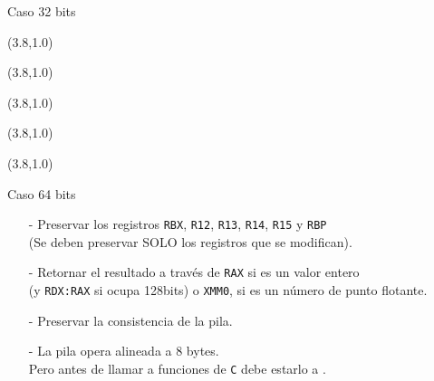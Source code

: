 \documentclass[aspectratio=169]{beamer}
\begin{document}
\begin{frame}{Caso 32 bits}
    \begin{textblock}{20}(3.8,1.0)  \end{textblock}
    \begin{textblock}{20}(3.8,1.0)  \end{textblock}
    \begin{textblock}{20}(3.8,1.0)  \end{textblock}
    \begin{textblock}{20}(3.8,1.0)  \end{textblock}
    \begin{textblock}{20}(3.8,1.0)  \end{textblock}
\end{frame}

\begin{frame}{Caso 64 bits}
    \begin{itemize}
    \setlength\itemsep{0.3cm}
    \item[-] Preservar los registros \texttt{RBX}, \texttt{R12}, \texttt{R13}, \texttt{R14}, \texttt{R15} y \texttt{RBP}\\
    (Se deben preservar SOLO los registros que se modifican).
    \pause
    \item[-] Retornar el resultado a través de \texttt{RAX} si es un valor entero\\ (y \texttt{RDX:RAX} si ocupa 128bits) o \texttt{XMM0},  si es un número de punto flotante.
    \pause
    \item[-] Preservar la consistencia de la pila.
    \pause
    \item[-] La pila opera alineada a 8 bytes.\\ Pero antes de llamar a funciones de \texttt{C} debe estarlo a \color{black}.
    \end{itemize}
\end{frame}
\end{document}

